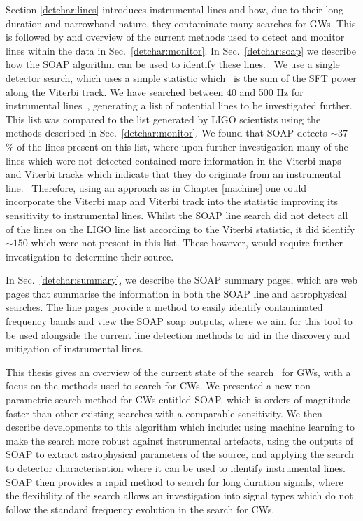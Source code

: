 Section \ref{detchar:lines} introduces instrumental lines and how, due to their
long duration and narrowband nature, they contaminate many searches for
\glspl{GW}.  This is followed by and overview of the current methods used to
detect and monitor lines within the data in Sec.~\ref{detchar:monitor}.  In
Sec.~\ref{detchar:soap} we describe how the SOAP algorithm can be used to
identify these lines.~  We use a single
detector search, which uses a simple statistic which~
is the sum of the \gls{SFT} power along the Viterbi track.  We have searched
between 40 and 500 Hz for instrumental lines~, generating
a list of potential lines to be investigated further.  This list was compared
to the list generated by \gls{LIGO} scientists using the methods described in
Sec.~\ref{detchar:monitor}.  We found that SOAP detects $\sim 37$ \% of the
lines present on this list, where upon further investigation many of the lines
which were not detected contained more information in the Viterbi maps and
Viterbi tracks which indicate that they do originate from an instrumental
line.~
Therefore, using an approach as in Chapter \ref{machine} one could incorporate
the Viterbi map and Viterbi track into the statistic improving its sensitivity
to instrumental lines.  Whilst the SOAP line search did not detect all of the
lines on the \gls{LIGO} line list according to the Viterbi statistic, it did
identify $\sim 150$ which were not present in this list.  These however, would
require further investigation to determine their source.

In Sec.~\ref{detchar:summary}, we describe the SOAP summary pages, which are
web pages that summarise the information in both the SOAP line and
astrophysical searches.  The line pages provide a method to easily identify
contaminated frequency bands and view the SOAP soap outputs, where we aim for
this tool to be used alongside the current line detection methods to aid in the
discovery and mitigation of instrumental lines.

\bigskip

This thesis gives an overview of the current state of the
search~ for \glspl{GW}, with a focus on the methods used to
search for \glspl{CW}.  We presented a new non-parametric search method for
\glspl{CW} entitled SOAP, which is orders of magnitude faster than other
existing searches with a comparable sensitivity.  We then describe developments
to this algorithm which include: using machine learning to make the search more
robust against instrumental artefacts, using the outputs of SOAP to extract
astrophysical parameters of the source, and applying the search to detector
characterisation where it can be used to identify instrumental lines.  SOAP
then provides a rapid method to search for long duration signals, where the
flexibility of the search allows an investigation into signal types which do
not follow the standard frequency evolution in the search for \glspl{CW}.

~









